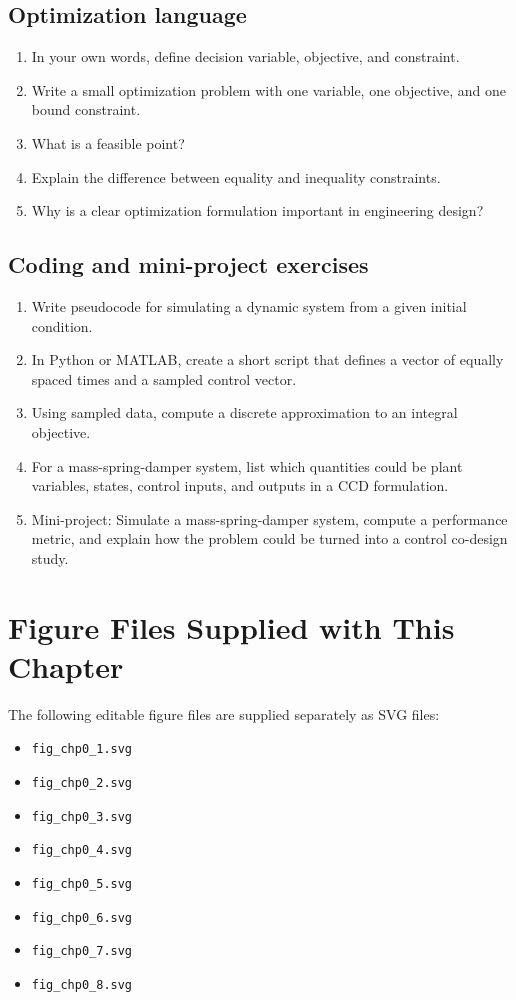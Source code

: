 \documentclass[11pt]{article}
\begin{document}
\subsection*{Optimization language}
\begin{enumerate}[leftmargin=1.5em,label=\textbf{P\arabic*.},resume]
  \item In your own words, define decision variable, objective, and constraint.
  \item Write a small optimization problem with one variable, one objective, and one bound constraint.
  \item What is a feasible point?
  \item Explain the difference between equality and inequality constraints.
  \item Why is a clear optimization formulation important in engineering design?
\end{enumerate}

\subsection*{Coding and mini-project exercises}
\begin{enumerate}[leftmargin=1.5em,label=\textbf{P\arabic*.},resume]
  \item Write pseudocode for simulating a dynamic system from a given initial condition.
  \item In Python or MATLAB, create a short script that defines a vector of equally spaced times and a sampled control vector.
  \item Using sampled data, compute a discrete approximation to an integral objective.
  \item For a mass-spring-damper system, list which quantities could be plant variables, states, control inputs, and outputs in a CCD formulation.
  \item Mini-project: Simulate a mass-spring-damper system, compute a performance metric, and explain how the problem could be turned into a control co-design study.
\end{enumerate}

\section{Figure Files Supplied with This Chapter}

The following editable figure files are supplied separately as SVG files:
\begin{itemize}[leftmargin=1.4em]
  \item \texttt{fig\_chp0\_1.svg}
  \item \texttt{fig\_chp0\_2.svg}
  \item \texttt{fig\_chp0\_3.svg}
  \item \texttt{fig\_chp0\_4.svg}
  \item \texttt{fig\_chp0\_5.svg}
  \item \texttt{fig\_chp0\_6.svg}
  \item \texttt{fig\_chp0\_7.svg}
  \item \texttt{fig\_chp0\_8.svg}
\end{itemize}
\end{document}
